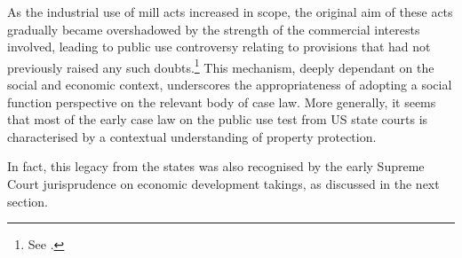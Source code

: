 As the industrial use of mill acts increased in scope, the original aim of these acts gradually became overshadowed by the strength of the commercial interests involved, leading to public use controversy relating to provisions that had not previously raised any such doubts.\footnote{See \cite{head86}.} This mechanism, deeply dependant on the social and economic context, underscores the appropriateness of adopting a social function perspective on the relevant body of case law. More generally, it seems that most of the early case law on the public use test from US state courts is characterised by a contextual understanding of property protection. 

In fact, this legacy from the states was also recognised by the early Supreme Court jurisprudence on economic development takings, as discussed in the next section. 

